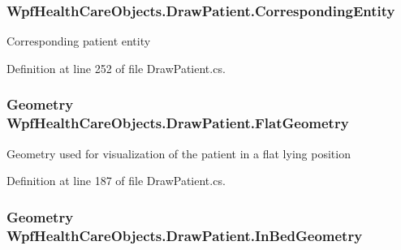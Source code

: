 \subsubsection[{\texorpdfstring{Corresponding\+Entity}{CorrespondingEntity}}]{ Wpf\+Health\+Care\+Objects.\+Draw\+Patient.\+Corresponding\+Entity\hspace{0.3cm}{\ttfamily [get]}}\hypertarget{class_wpf_health_care_objects_1_1_draw_patient_a28007bb3945535d80d692740aabe28d5}{}\label{class_wpf_health_care_objects_1_1_draw_patient_a28007bb3945535d80d692740aabe28d5}


Corresponding patient entity 



Definition at line 252 of file Draw\+Patient.\+cs.

\subsubsection[{\texorpdfstring{Flat\+Geometry}{FlatGeometry}}]{\setlength{\rightskip}{0pt plus 5cm}Geometry Wpf\+Health\+Care\+Objects.\+Draw\+Patient.\+Flat\+Geometry\hspace{0.3cm}{\ttfamily [get]}}\hypertarget{class_wpf_health_care_objects_1_1_draw_patient_a40fe44703a4433f9089f63a87563572d}{}\label{class_wpf_health_care_objects_1_1_draw_patient_a40fe44703a4433f9089f63a87563572d}


Geometry used for visualization of the patient in a flat lying position 



Definition at line 187 of file Draw\+Patient.\+cs.

\subsubsection[{\texorpdfstring{In\+Bed\+Geometry}{InBedGeometry}}]{\setlength{\rightskip}{0pt plus 5cm}Geometry Wpf\+Health\+Care\+Objects.\+Draw\+Patient.\+In\+Bed\+Geometry\hspace{0.3cm}{\ttfamily [get]}}\hypertarget{class_wpf_health_care_objects_1_1_draw_patient_afcca0dd2554cc574a74c48ccc47f5269}{}\label{class_wpf_health_care_objects_1_1_draw_patient_afcca0dd2554cc574a74c48ccc47f5269}


